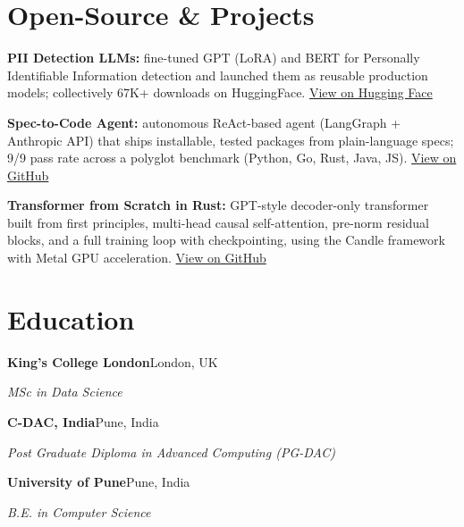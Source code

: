 \documentclass[10pt,a4paper]{article}
\begin{document}
\section{Open-Source \& Projects}
\begin{tight}
  \item \textbf{PII Detection LLMs:} fine-tuned GPT (LoRA) and BERT for Personally Identifiable Information detection and launched them as reusable production models; collectively 67K+ downloads on HuggingFace. \href{https://huggingface.co/ab-ai/pii_model}{View on Hugging Face}
  \item \textbf{Spec-to-Code Agent:} autonomous ReAct-based agent (LangGraph + Anthropic API) that ships installable, tested packages from plain-language specs; 9/9 pass rate across a polyglot benchmark (Python, Go, Rust, Java, JS). \href{https://github.com/abhijeetscode/Spec-to-Code-Agent}{View on GitHub}
  \item \textbf{Transformer from Scratch in Rust:} GPT-style decoder-only transformer built from first principles, multi-head causal self-attention, pre-norm residual blocks, and a full training loop with checkpointing, using the Candle framework with Metal GPU acceleration. \href{https://github.com/abhijeetscode/transformer-rust}{View on GitHub}
\end{tight}

\section{Education}
{\color{company}\bfseries King's College London}\hfill {\color{muted}London, UK}\par
{\itshape MSc in Data Science}\par\vspace{1pt}
{\color{company}\bfseries C-DAC, India}\hfill {\color{muted}Pune, India}\par
{\itshape Post Graduate Diploma in Advanced Computing (PG-DAC)}\par\vspace{1pt}
{\color{company}\bfseries University of Pune}\hfill {\color{muted}Pune, India}\par
{\itshape B.E. in Computer Science}\par
\end{document}
